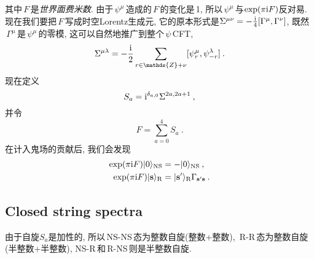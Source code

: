 其中$\,F\,$是{\emph{世界面费米数}}. 由于$\,\psi^{\mu}\,$造成的$\,F\,$的变化是\,1, 所以$\,\psi^{\mu}\,$与$\exp(\pi\mathrm{i} F)$反对易. 现在我们要把$\,F\,$写成时空Lorentz生成元, 它的原本形式是$\Sigma^{\mu\nu}=-\frac{\mathrm{i}}{4}[\Gamma^{\mu},\Gamma^{\nu}]$, 既然$\,\Gamma^{\mu}\,$是$\,\psi^{\mu}\,$的零模, 这可以自然地推广到整个$\,\psi\,$CFT,
\begin{equation}
    \Sigma^{\mu\lambda}=
    -\frac{\mi}{2}\sum_{r\in\mathds{Z}+\nu}[\psi_{r}^{\mu},\psi_{-r}^{\lambda}]\:. \label{10.2.20}
\end{equation}
现在定义
\begin{equation}
    S_{a}=\mathrm{i}^{\delta_{a,0}}\Sigma^{2a,2a+1} \:, \label{102.21}
\end{equation}
并令
\begin{equation}
    F=\sum_{a=0}^{4}S_{a}\:. \label{10.2.22}
\end{equation}
在计入鬼场的贡献后, 我们会发现
\begin{subequations}
\begin{align}
    \exp(\pi\mathrm{i} F)\lvert 0\rangle_{\text{NS}}& =-\lvert 0\rangle_{\text{NS}}\:, \label{10.2.24a} \\
    \exp(\pi\mathrm{i} F)\lvert \mathbf{s}\rangle_{\text{R}}&=\lvert\mathbf{s}^{\prime}\rangle_{\text{R}}\Gamma_{\mathbf{s}^{\prime}\mathbf{s}}\:. \label{10.2.24b}
\end{align} \label{10.2.24}
\end{subequations}

\subsection*{Closed string spectra}
 
由于自旋$S_{a}$是加性的, 所以\,NS-NS\,态为整数自旋(整数+整数), \,R-R\,态为整数自旋(半整数+半整数), NS-R\,和\,R-NS\,则是半整数自旋. 

